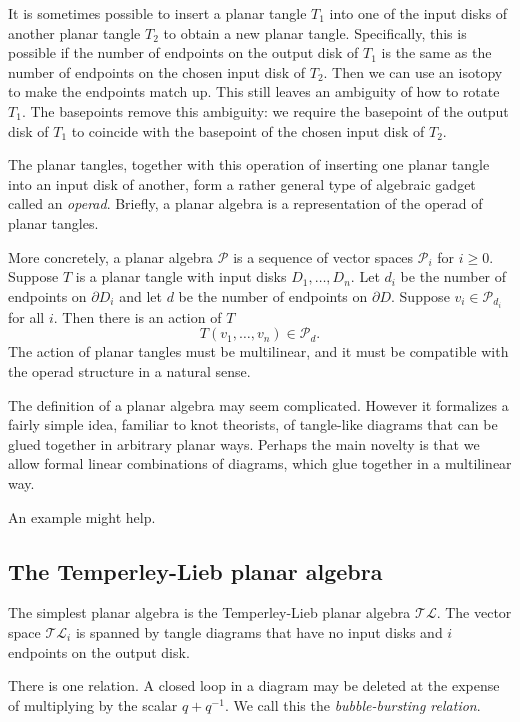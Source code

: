 It is sometimes possible to
insert a planar tangle $T_1$
into one of the input disks of another planar tangle $T_2$
to obtain a new planar tangle.
Specifically,
this is possible if
the number of endpoints on the output disk of $T_1$
is the same as the number of endpoints
on the chosen input disk of $T_2$.
Then we can use an isotopy to make the endpoints match up.
This still leaves an ambiguity of how to rotate $T_1$.
The basepoints remove this ambiguity:
we require the basepoint of the output disk of $T_1$
to coincide with the basepoint of the chosen input disk of $T_2$.

The planar tangles,
together with this operation of inserting one planar tangle
into an input disk of another,
form a rather general type of algebraic gadget called an
{\em operad}.
Briefly,
a planar algebra
is a representation of the operad of planar tangles.

More concretely,
a planar algebra $\mathcal{P}$ is a sequence of vector spaces 
$\mathcal{P}_i$ for $i \ge 0$.
Suppose $T$ is a planar tangle
with input disks $D_1, \dots, D_n$.
Let $d_i$ be the number of endpoints on $\partial D_i$
and let $d$ be the number of endpoints on $\partial D$.
Suppose $v_i \in \mathcal{P}_{d_i}$ for all $i$.
Then there is an action of $T$
$$T(v_1, \dots, v_n) \in \mathcal{P}_d.$$
The action of planar tangles
must be multilinear,
and it must be compatible with the operad structure
in a natural sense.

The definition of a planar algebra may seem complicated.
However it formalizes a fairly simple idea,
familiar to knot theorists,
of tangle-like diagrams
that can be glued together in arbitrary planar ways.
Perhaps the main novelty
is that we allow
formal linear combinations of diagrams,
which glue together in a multilinear way.

An example might help.

\subsection{The Temperley-Lieb planar algebra}

The simplest planar algebra is
the Temperley-Lieb planar algebra $\mathcal{TL}$.
The vector space $\mathcal{TL}_i$
is spanned by tangle diagrams that have no input disks
and $i$ endpoints on the output disk.

There is one relation.
A closed loop in a diagram
may be deleted
at the expense of multiplying by the scalar $q + q^{-1}$.
We call this the {\em bubble-bursting relation}.

